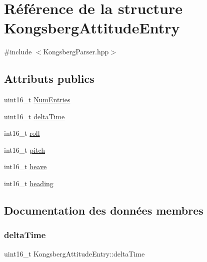 \hypertarget{structKongsbergAttitudeEntry}{}\section{Référence de la structure Kongsberg\+Attitude\+Entry}
\label{structKongsbergAttitudeEntry}


{\ttfamily \#include $<$Kongsberg\+Parser.\+hpp$>$}

\subsection*{Attributs publics}
\begin{DoxyCompactItemize}
\item 
uint16\+\_\+t \hyperlink{structKongsbergAttitudeEntry_a9b6a73b3b1fa67ee696e2ec73c0fe837}{Num\+Entries}
\item 
uint16\+\_\+t \hyperlink{structKongsbergAttitudeEntry_a300a0518f2405865a960816e561680b1}{delta\+Time}
\item 
int16\+\_\+t \hyperlink{structKongsbergAttitudeEntry_a130bbc4115e74b4932ca5a9787e944e4}{roll}
\item 
int16\+\_\+t \hyperlink{structKongsbergAttitudeEntry_ab4995036069d41a73c8f0dc11a8766ee}{pitch}
\item 
int16\+\_\+t \hyperlink{structKongsbergAttitudeEntry_a95140a0fd7d9982f0fb6c47573d7a594}{heave}
\item 
int16\+\_\+t \hyperlink{structKongsbergAttitudeEntry_a7dc42f0fdc8852f1d39270b761925535}{heading}
\end{DoxyCompactItemize}


\subsection{Documentation des données membres}
\mbox{\label{structKongsbergAttitudeEntry_a300a0518f2405865a960816e561680b1}} 
\subsubsection{\texorpdfstring{delta\+Time}{deltaTime}}
{\footnotesize\ttfamily uint16\+\_\+t Kongsberg\+Attitude\+Entry\+::delta\+Time}

